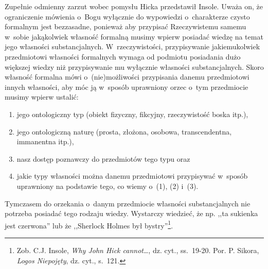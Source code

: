 Zupełnie odmienny zarzut wobec pomysłu Hicka przedstawił Insole. Uważa on, że ograniczenie mówienia o~Bogu wyłącznie do wypowiedzi o~charakterze czysto formalnym jest bezzasadne, ponieważ aby przypisać Rzeczywistemu samemu w~sobie jakąkolwiek własność formalną musimy wpierw posiadać wiedzę na temat jego własności substancjalnych. W~rzeczywistości, przypisywanie jakiemukolwiek przedmiotowi własności formalnych wymaga od podmiotu posiadania dużo większej wiedzy niż przypisywanie mu wyłącznie własności substancjalnych. Skoro własność formalna mówi o~(nie)możliwości przypisania danemu przedmiotowi innych własności, aby móc ją w~sposób uprawniony orzec o~tym przedmiocie musimy wpierw ustalić:

\begin{enumerate}[label = (\arabic*)]
\item jego ontologiczny typ (obiekt fizyczny, fikcyjny, rzeczywistość boska itp.),
\item jego ontologiczną naturę (prosta, złożona, osobowa, transcendentna, immanentna itp.),
\item nasz dostęp poznawczy do przedmiotów tego typu oraz
\item jakie typy własności można danemu przedmiotowi przypisywać w~sposób uprawniony na podstawie tego, co wiemy o~(1), (2) i~(3).
\end{enumerate}
Tymczasem do orzekania o~danym przedmiocie własności substancjalnych nie potrzeba posiadać tego rodzaju wiedzy. Wystarczy wiedzieć, że np. ,,ta sukienka jest czerwona'' lub że ,,Sherlock Holmes był bystry''\footnote{Zob. C.J. Insole, \textit{Why John Hick cannot}\ldots, dz. cyt., ss.~19-20. Por. P. Sikora, \textit{Logos Niepojęty}, dz. cyt., s.~121.}.

